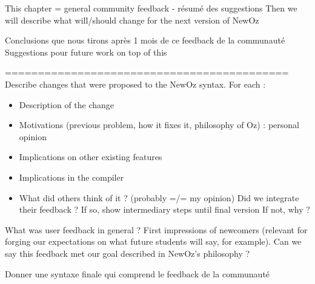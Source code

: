 

This chapter = general community feedback - résumé des suggestions
Then we will describe what will/should change for the next version of NewOz

Conclusions que nous tirons après 1 mois de ce feedback de la communauté
Suggestions pour future work on top of this

===========================================
Describe changes that were proposed to the NewOz syntax.
For each :
\begin{itemize}
    \item Description of the change
    \item Motivations (previous problem, how it fixes it, philosophy of Oz) : personal opinion
    \item Implications on other existing features
    \item Implications in the compiler
    \item What did others think of it ? (probably =/= my opinion)
    Did we integrate their feedback ?
    If so, show intermediary steps until final version
    If not, why ?
\end{itemize}

What was user feedback in general ?
First impressions of newcomers (relevant for forging our expectations on what future students will say, for example).
Can we say this feedback met our goal described in NewOz's philosophy ?

Donner une syntaxe finale qui comprend le feedback de la communauté